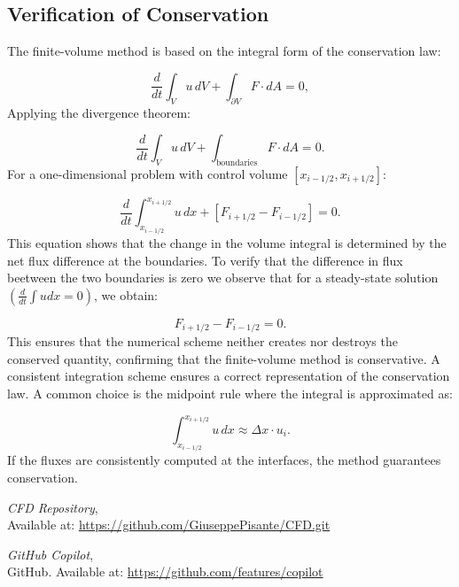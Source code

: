 \documentclass{article}
\begin{document}
  \subsection{Verification of Conservation}

  The finite-volume method is based on the integral form of the conservation law:
  
  \begin{equation}
  \frac{d}{dt} \int_{V} u \, dV + \int_{\partial V} F \cdot dA = 0,
  \end{equation}
  Applying the divergence theorem:
  
  \begin{equation}
  \frac{d}{dt} \int_{V} u \, dV + \int_{\text{boundaries}} F \cdot dA = 0.
  \end{equation}
  For a one-dimensional problem with control volume \( [x_{i-1/2}, x_{i+1/2}] \):
  
  \begin{equation}
  \frac{d}{dt} \int_{x_{i-1/2}}^{x_{i+1/2}} u \, dx + \left[F_{i+1/2} - F_{i-1/2} \right] = 0.
  \end{equation}
  This equation shows that the change in the volume integral is determined by the net flux difference at the boundaries.
  To verify that the difference in flux beetween the two boundaries is zero we observe that for a steady-state solution \( \left( \frac{d}{dt} \int u dx = 0 \right) \), we obtain:
  
  \begin{equation}
  F_{i+1/2} - F_{i-1/2} = 0.
  \end{equation}
  This ensures that the numerical scheme neither creates nor destroys the conserved quantity, confirming that the finite-volume method is conservative.
  A consistent integration scheme ensures a correct representation of the conservation law. A common choice is the midpoint rule where the integral is approximated as:
  
  \begin{equation}
  \int_{x_{i-1/2}}^{x_{i+1/2}} u \, dx \approx \Delta x \cdot u_i.
  \end{equation}
  If the fluxes are consistently computed at the interfaces, the method guarantees conservation.

\begin{thebibliography}{9}
    \textit{CFD Repository},\\
    Available at: \url{https://github.com/GiuseppePisante/CFD.git}
    
    \textit{GitHub Copilot},\\
    GitHub. Available at: \url{https://github.com/features/copilot}
  \end{thebibliography}
  
  
\end{document}
